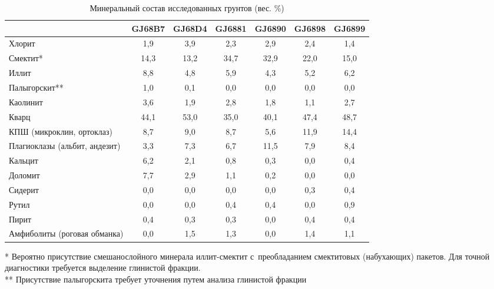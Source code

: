 \begin{table}[h!]
  \small
    \centering
  \begin{threeparttable}
  \caption{Минеральный состав исследованных грунтов (вес. \%)}
  \label{tab:mineral}
    \begin{tabular}{|l|c|c|c|c|c|c|}
        \hline
                                  & GJ68B7 & GJ68D4 & GJ6881 & GJ6890 & GJ6898 & GJ6899 \\ \hline
    Хлорит                        & 1,9  & 3,9  & 2,3  & 2,9  & 2,4  & 1,4  \\ \hline
    Смектит*                      & 14,3 & 13,2 & 34,7 & 32,9 & 22,0 & 15,0 \\ \hline
    Иллит                         & 8,8  & 4,8  & 5,9  & 4,3  & 5,2  & 6,2  \\ \hline
    Палыгорскит**                 & 1,0  & 0,1  & 0,0  & 0,0  & 0,0  & 0,0  \\ \hline
    Каолинит                      & 3,6  & 1,9  & 2,8  & 1,8  & 1,1  & 2,7  \\ \hline
    Кварц                         & 44,1 & 53,0 & 35,0 & 40,1 & 47,4 & 48,7 \\ \hline
    КПШ (микроклин, ортоклаз)     & 8,7  & 9,0  & 8,7  & 5,6  & 11,9 & 14,4 \\ \hline
    Плагиоклазы (альбит, андезит) & 3,3  & 7,3  & 6,7  & 11,5 & 7,9  & 8,4  \\ \hline
    Кальцит                       & 6,2  & 2,1  & 0,8  & 0,3  & 0,0  & 0,4  \\ \hline
    Доломит                       & 7,7  & 2,9  & 1,1  & 0,2  & 0,0  & 0,0  \\ \hline
    Сидерит                       & 0,0  & 0,0  & 0,0  & 0,0  & 0,3  & 0,4  \\ \hline
    Рутил                         & 0,0  & 0,0  & 0,4  & 0,4  & 0,0  & 0,9  \\ \hline
    Пирит                         & 0,4  & 0,3  & 0,3  & 0,0  & 0,4  & 0,4  \\ \hline
    Амфиболиты (роговая обманка)  & 0,0  & 1,5  & 1,3  & 0,0  & 1,4  & 1,1  \\ \hline
    \end{tabular}
    \raggedright 
    * Вероятно присутствие смешанослойного минерала иллит-смектит с~преобладанием смектитовых 
    (набухающих) пакетов. 
    Для точной диагностики требуется выделение глинистой фракции.
    \\
    ** Присутствие палыгорскита требует уточнения путем анализа глинистой фракции
    \\
    \end{threeparttable}
    \end{table}

